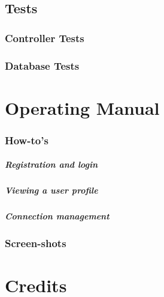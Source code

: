 \documentclass[12pt]{report}
\begin{document}
\section{Tests}
\subsection{Controller Tests}
\subsection{Database Tests}


\chapter{Operating Manual}
\subsection{How-to's}
\paragraph{Registration and login}
\paragraph{Viewing a user profile}
\paragraph{Connection management}

\subsection{Screen-shots}

\chapter{Credits}
\end{document}
